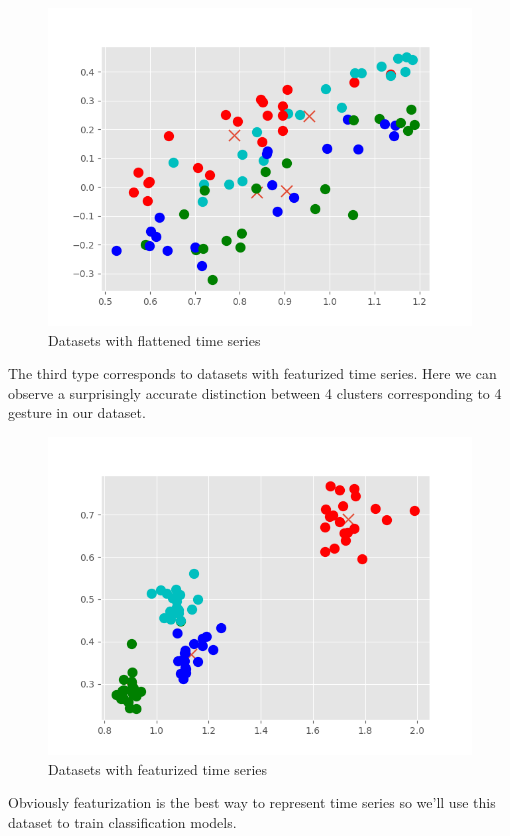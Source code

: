 \documentclass[conference,compsoc]{IEEEtran}
\begin{document}
\begin{figure}[h]
\caption{Datasets with flattened time series}
\includegraphics[scale=0.40]{ds2}
\centering
\end{figure}

The third type corresponds to datasets with featurized time series. Here we can observe a surprisingly accurate distinction between 4 clusters corresponding to 4 gesture in our dataset.

\begin{figure}[h]
\caption{Datasets with featurized time series}
\includegraphics[scale=0.40]{ds3}
\centering
\end{figure}

Obviously featurization is the best way to represent time series so we'll use this dataset to train classification models.
\end{document}
